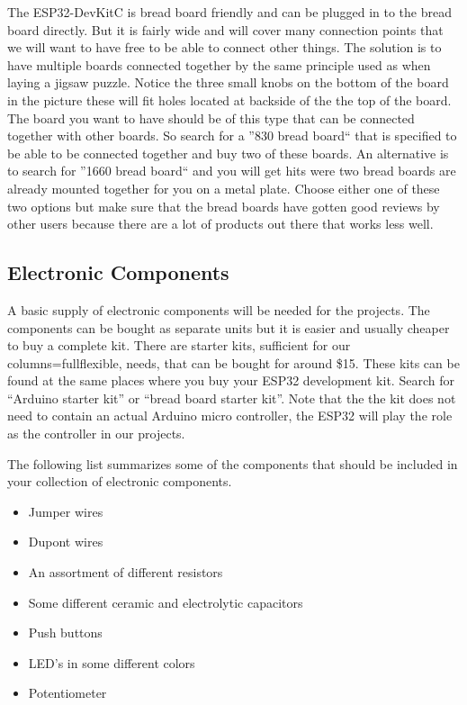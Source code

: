 \documentclass{tufte-book}
\begin{document}
	The ESP32-DevKitC is bread board friendly and can be plugged in to the bread board directly. But it is fairly wide and will cover many connection points that we will want to have free to be able to connect other things. The solution is to have multiple boards connected together by the same principle used as when laying a jigsaw puzzle. Notice the three small knobs on the bottom of the board in the picture these will fit holes located at backside of the the top of the board. The board you want to have should be of this type that can be connected together with other boards. So search for a ''830 bread board`` that is specified to be able to be connected together and buy two of these boards. An alternative is to search for ''1660 bread board`` and you will get hits were two bread boards are already mounted together for you on a metal plate. Choose either one of these two options but make sure that the bread boards have gotten good reviews by other users because there are a lot of products out there that works less well. 
	
	\subsection{Electronic Components}
	A basic supply of electronic components will be needed for the projects. The components can be bought as separate units but it is easier and usually cheaper to buy a complete kit. There are starter kits, sufficient for our	columns=fullflexible, needs, that can be bought for around \$15. These kits can be found at the same places where you buy your ESP32 development kit. Search for ``Arduino starter kit'' or ``bread board starter kit''. Note that the the kit does not need to contain an actual Arduino micro controller, the ESP32 will play the role as the controller in our projects.
	
	The following list summarizes some of the components that should be included in your collection of electronic components.
	
	\begin{itemize}
		\item Jumper wires
		\item Dupont wires
		\item An assortment of different resistors
		\item Some different ceramic and electrolytic capacitors
		\item Push buttons
		\item LED's in some different colors 
		\item Potentiometer
	\end{itemize}
	
\end{document}
